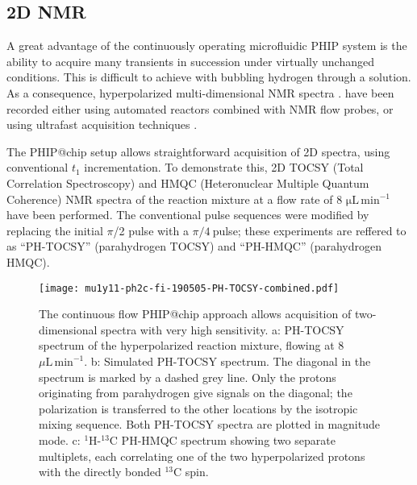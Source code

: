 \subsection{2D NMR}

A great advantage of the continuously operating microfluidic PHIP system is the
ability to acquire many transients in succession under virtually unchanged
conditions.
This is difficult to achieve with bubbling hydrogen through a solution.
As a consequence, hyperpolarized multi-dimensional NMR spectra \cite{Mishkovsky:2008cl,Giraudeau:2009fn,Roth:2010hk,Lloyd:2012cf,Eshuis:2015ce,Kiryutin:2019hy}. have been recorded
either using automated reactors combined with NMR flow probes, \cite{Lloyd:2012cf,Eshuis:2015ce}
or using ultrafast acquisition techniques \cite{Mishkovsky:2008cl,Giraudeau:2009fn,Kiryutin:2019hy}.

The PHIP@chip setup allows straightforward acquisition of 2D spectra, using
conventional $t_1$ incrementation.
To demonstrate this, 2D TOCSY (Total Correlation
Spectroscopy) and HMQC (Heteronuclear Multiple Quantum Coherence) NMR spectra
of the reaction mixture at a flow rate of 8 $\mathrm{\mu L\,min^{-1}}$ have been performed.
The conventional
pulse sequences were modified by replacing the initial \(\pi\)/2 pulse with a
\(\pi/4\ \)pulse; these experiments are reffered to as ``PH-TOCSY'' (parahydrogen TOCSY) and
``PH-HMQC'' (parahydrogen HMQC).

\begin{figure}
	\centering
	\texttt{[image: mu1y11-ph2c-fi-190505-PH-TOCSY-combined.pdf]}
	\caption{
		The continuous flow PHIP@chip approach allows acquisition of
		two-dimensional spectra with very high sensitivity.
    a: PH-TOCSY spectrum of the hyperpolarized reaction mixture,
		flowing at 8~$\mu\mathrm{L}\,\text{min}^{-1}$.
    b: Simulated PH-TOCSY spectrum. The diagonal in the spectrum is marked by a dashed grey
		line. Only the protons originating from parahydrogen give signals on
		the diagonal; the polarization is transferred to the other locations by
		the isotropic mixing sequence. Both PH-TOCSY spectra are plotted in
    magnitude mode.
    c: $^1$H-$^{13}$C PH-HMQC spectrum
		showing two separate multiplets, each correlating one of the two
		hyperpolarized protons with the directly bonded $^{13}$C spin.
}
	\label{fig:PH-TOCSY-HMQC}
\end{figure}

